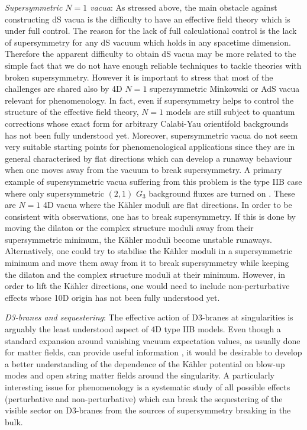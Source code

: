 \documentclass[11pt,a4paper]{article}
\begin{document}
\item \emph{Supersymmetric $N=1$ vacua}: As stressed above, the main obstacle against constructing dS vacua is the difficulty to have an effective field theory which is under full control. The reason for the lack of full calculational control is the lack of supersymmetry for any dS vacuum which holds in any spacetime dimension. Therefore the apparent difficulty to obtain dS vacua may be more related to the simple fact that we do not have enough reliable techniques to tackle theories with broken supersymmetry. However it is important to stress that most of the challenges are shared also by 4D $N=1$ supersymmetric Minkowski or AdS vacua relevant for phenomenology. In fact, even if supersymmetry helps to control the structure of the effective field theory, $N=1$ models are still subject to quantum corrections whose exact form for arbitrary Calabi-Yau orientifold backgrounds has not been fully understood yet. Moreover, supersymmetric vacua do not seem very suitable starting points for phenomenological applications since they are in general characterised by flat directions which can develop a runaway behaviour when one moves away from the vacuum to break supersymmetry. A primary example of supersymmetric vacua suffering from this problem is the type IIB case where only supersymmetric $(2,1)$ $G_3$ background fluxes are turned on \cite{Dasgupta:1999ss,Giddings:2001yu}. These are $N=1$ 4D vacua where the K\"ahler moduli are flat directions. In order to be consistent with observations, one has to break supersymmetry. If this is done by moving the dilaton or the complex structure moduli away from their supersymmetric minimum, the K\"ahler moduli become unstable runaways. Alternatively, one could try to stabilise the K\"ahler moduli in a supersymmetric minimum and move them away from it to break supersymmetry while keeping the dilaton and the complex structure moduli at their minimum. However, in order to lift the K\"ahler directions, one would need to include non-perturbative effects whose 10D origin has not been fully understood yet.

\item \emph{D3-branes and sequestering}: The effective action of D3-branes at singularities is arguably the least understood aspect of 4D type IIB models. Even though a standard expansion around vanishing vacuum expectation values, as usually done for matter fields, can provide useful information \cite{Conlon:2008wa}, it would be desirable to develop a better understanding of the dependence of the K\"ahler potential on blow-up modes and open string matter fields around the singularity. A particularly interesting issue for phenomenology is a systematic study of all possible effects (perturbative and non-perturbative) which can break the sequestering of the visible sector on D3-branes from the sources of supersymmetry breaking in the bulk.
\end{document}
